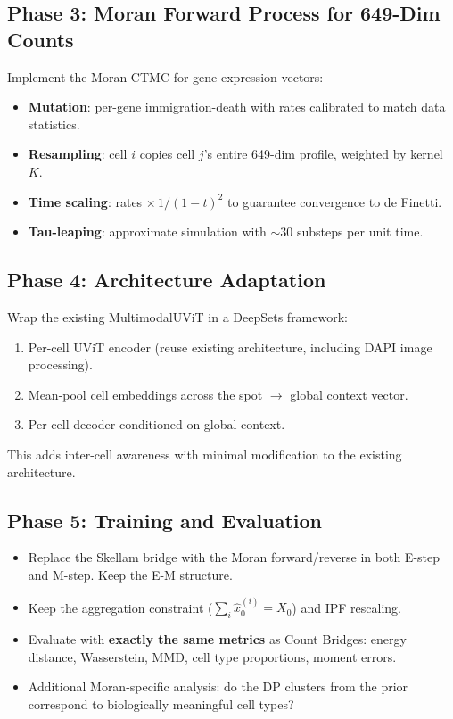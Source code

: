 \documentclass[11pt]{article}
\begin{document}
\subsection{Phase 3: Moran Forward Process for 649-Dim Counts}

Implement the Moran CTMC for gene expression vectors:
\begin{itemize}
  \item \textbf{Mutation}: per-gene immigration-death with rates calibrated to match data statistics.
  \item \textbf{Resampling}: cell $i$ copies cell $j$'s entire 649-dim profile, weighted by kernel $K$.
  \item \textbf{Time scaling}: rates $\times\, 1/(1-t)^2$ to guarantee convergence to de Finetti.
  \item \textbf{Tau-leaping}: approximate simulation with ${\sim}30$ substeps per unit time.
\end{itemize}

\subsection{Phase 4: Architecture Adaptation}

Wrap the existing MultimodalUViT in a DeepSets framework:
\begin{enumerate}
  \item Per-cell UViT encoder (reuse existing architecture, including DAPI image processing).
  \item Mean-pool cell embeddings across the spot $\to$ global context vector.
  \item Per-cell decoder conditioned on global context.
\end{enumerate}

This adds inter-cell awareness with minimal modification to the existing architecture.

\subsection{Phase 5: Training and Evaluation}

\begin{itemize}
  \item Replace the Skellam bridge with the Moran forward/reverse in both E-step and M-step. Keep the E-M structure.
  \item Keep the aggregation constraint ($\sum_i \hat{x}_0^{(i)} = X_0$) and IPF rescaling.
  \item Evaluate with \textbf{exactly the same metrics} as Count Bridges: energy distance, Wasserstein, MMD, cell type proportions, moment errors.
  \item Additional Moran-specific analysis: do the DP clusters from the prior correspond to biologically meaningful cell types?
\end{itemize}
\end{document}
